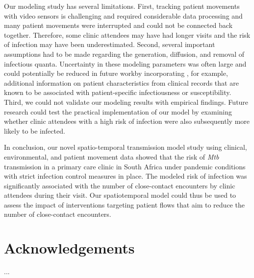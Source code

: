 \documentclass[fleqn,11pt]{wlscirep}
\begin{document}
Our modeling study has several limitations. First, tracking patient movements with video sensors is challenging and required considerable data processing and many patient movements were interrupted and could not be connected back together. Therefore, some clinic attendees may have had longer visits and the risk of infection may have been underestimated. Second, several important assumptions had to be made regarding the generation, diffusion, and removal of infectious quanta. Uncertainty in these modeling parameters was often large and could potentially be reduced in future workby incorporating , for example, additional information on patient characteristics from clinical records that are known to be associated with patient-specific infectiousness\cite{Escombe2008PLoSMed} or susceptibility\cite{Furin2019Lancet}. Third, we could not validate our modeling results with empirical findings. Future research could test the practical implementation of our model by examining whether clinic attendees with a high risk of infection were also subsequently more likely to be infected.  

In conclusion, our novel spatio-temporal transmission model study using clinical, environmental, and patient movement data showed that the risk of \emph{Mtb} transmission in a primary care clinic in South Africa under pandemic conditions with strict infection control measures in place.  The modeled risk of infection was significantly associated with the number of close-contact encounters by clinic attendees during their visit. Our spatiotemporal model could thus be used to assess the impact of interventions targeting patient flows that aim to reduce the number of close-contact encounters. 


\newpage


\section*{Acknowledgements}
...


\end{document}
